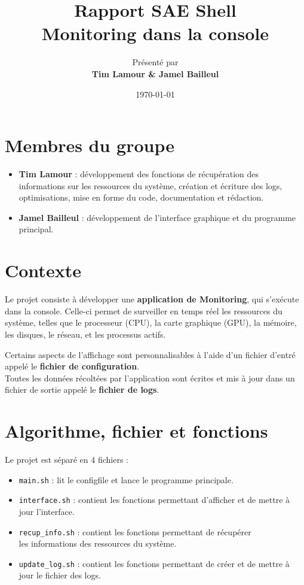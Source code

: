\documentclass{article}
\title{\Huge \textbf{Rapport SAE Shell} \\[0.5cm] \Large Monitoring dans la console}
\author{\large Présenté par\\ \textbf{Tim Lamour \& Jamel Bailleul}}
\date{\today}
\begin{document}
\maketitle %
\tableofcontents %
\newpage

\section{Membres du groupe}
\begin{itemize}
    \item \textbf{Tim Lamour} : développement des fonctions de récupération des informations sur les ressources du système, création et écriture des logs, optimisations, mise en forme du code, documentation et rédaction.
    \item \textbf{Jamel Bailleul} : développement de l'interface graphique et du programme principal.

\end{itemize}

\section{Contexte}
Le projet consiste à développer une \textbf{application de Monitoring}, qui s'exécute dans la console.
Celle-ci permet de surveiller en temps réel les ressources du système, telles que le processeur (CPU), la carte graphique (GPU), la mémoire, les disques, le réseau, et les processus actifs.
\vspace{1em}

Certains aspects de l'affichage sont personnalisables à l'aide d'un fichier d'entré appelé le \textbf{fichier de configuration}.
\\
Toutes les données récoltées par l'application sont écrites et mis à jour dans un fichier de sortie appelé le \textbf{fichier de logs}.

\section{Algorithme, fichier et fonctions}
Le projet est séparé en 4 fichiers :
\begin{itemize}
    \item \texttt{main.sh} : lit le configfile et lance le programme principale.
    \item \texttt{interface.sh} : contient les fonctions permettant d'afficher et de mettre à jour l'interface.
    \item \texttt{recup\_info.sh} : contient les fonctions permettant de récupérer\\ les informations des ressources du système.
    \item \texttt{update\_log.sh} : contient les fonctions permettant de créer et de mettre à jour le fichier des logs. 
\end{itemize}
\vspace{1em}
\end{document}
